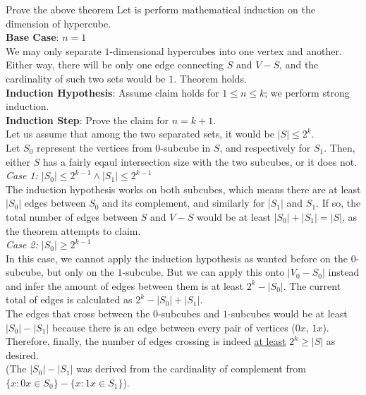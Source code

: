 \begin{ln-quest}{Prove the above theorem}{}
    Let is perform mathematical induction on the dimension of hypercube. \\
    \textbf{Base Case}: $n = 1$ \\
    We may only separate $1$-dimensional hypercubes into one vertex and another. Either way, there will be only one edge connecting $S$ and $V - S$, and the cardinality of such two sets would be $1$. Theorem holds. \\
    \textbf{Induction Hypothesis}: Assume claim holds for $1 \leq n \leq k$; we perform strong induction. \\
    \textbf{Induction Step}: Prove the claim for $n = k + 1$. \\
    Let us assume that among the two separated sets, it would be $|S| \leq 2^k$. \\
    Let $S_0$ represent the vertices from $0$-subcube in $S$, and respectively for $S_1$. Then, either $S$ has a fairly eqaul intersection size with the two subcubes, or it does not. \\
    \textit{Case 1: $|S_0| \leq 2^{k - 1} \land |S_1| \leq 2^{k - 1}$} \\
    The induction hypothesis works on both subcubes, which means there are at least $|S_0|$ edges between $S_0$ and its complement, and similarly for $|S_1|$ and $S_1$. If so, the total number of edges between $S$ and $V - S$ would be at least $|S_0| + |S_1| = |S|$, as the theorem attempts to claim. \\
    \textit{Case 2: $|S_0| \geq 2^{k - 1}$} \\
    In this case, we cannot apply the induction hypothesis as wanted before on the $0$-subcube, but only on the $1$-subcube. But we can apply this onto $|V_0 - S_0|$ instead and infer the amount of edges between them is at least $2^k - |S_0|$. The current total of edges is calculated as $2^k - |S_0| + |S_1|$. \\
    The edges that cross between the $0$-subcubes and $1$-subcubes would be at least $|S_0| - |S_1|$ because there is an edge between every pair of vertices ($0x$, $1x$). Therefore, finally, the number of edges crossing is indeed \underline{at least} $2^k \geq |S|$ as desired. \\
    (The $|S_0| - |S_1|$ was derived from the cardinality of complement from $\{x : 0x \in S_0\} - \{x : 1x \in S_1\}$).
\end{ln-quest}
